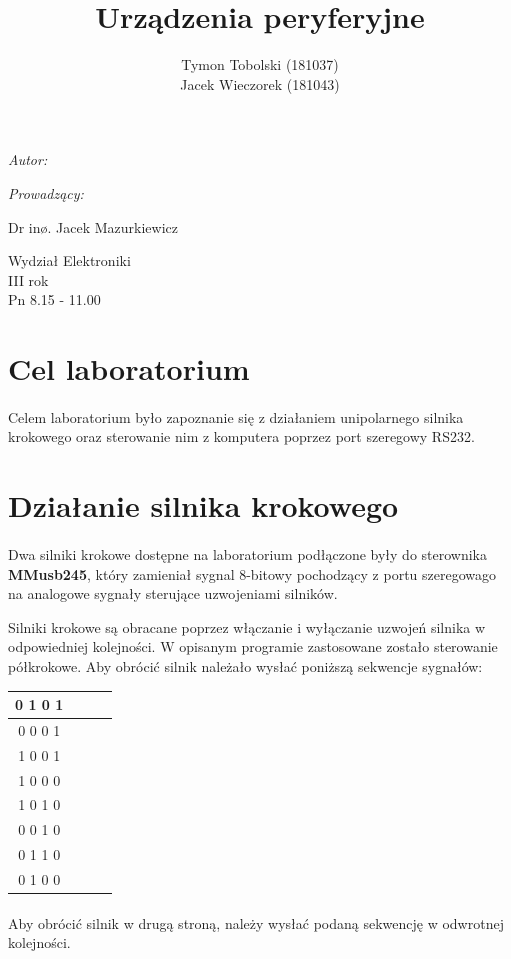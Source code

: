 \documentclass[wide,a4paper,titlepage,12pt] {article}
\title{Urządzenia peryferyjne}
\author{Tymon Tobolski (181037)\\ Jacek Wieczorek (181043)}
\makeatletter
\renewcommand{\maketitle}{
\begin{titlepage}
  \begin{center}
    \vspace*{3cm}
    \LARGE \@title \par
    \vspace{2cm}
    \textit{\small Autor:}\par
    \normalsize \@author\par \normalsize
    \vspace{3cm}
    \textit{\small Prowadzący:}\par
    Dr inø. Jacek Mazurkiewicz \par
    \vspace{2cm}
    Wydział Elektroniki\\ III rok\\ Pn 8.15 - 11.00\par
    \vspace{4cm}
    \small \@date
  \end{center}
\end{titlepage}
}
\makeatother
\begin{document}
\maketitle

\section{Cel laboratorium}
\paragraph{}
Celem laboratorium było zapoznanie się z działaniem unipolarnego silnika krokowego
oraz sterowanie nim z komputera poprzez port szeregowy RS232.

\section{Działanie silnika krokowego}
\paragraph{}
Dwa silniki krokowe dostępne na laboratorium podłączone były do sterownika \textbf{MMusb245},
który zamieniał sygnal 8-bitowy pochodzący z portu szeregowago na analogowe sygnały sterujące uzwojeniami silników.

Silniki krokowe są obracane poprzez włączanie i wyłączanie uzwojeń silnika w odpowiedniej kolejności.
W opisanym programie zastosowane zostało sterowanie półkrokowe. Aby obrócić silnik należało wysłać poniższą sekwencje sygnałów:


\begin{center}
    \begin{tabular}{|c|c|c|c|}
    \hline
    0 1 0 1 \\
    \hline
    0 0 0 1 \\
    \hline
    1 0 0 1 \\
    \hline
    1 0 0 0 \\
    \hline
    1 0 1 0 \\
    \hline
    0 0 1 0 \\
    \hline
    0 1 1 0 \\
    \hline
    0 1 0 0 \\
    \hline
   \end{tabular}
\end{center}


\paragraph{}
Aby obrócić silnik w drugą stroną, należy wysłać podaną sekwencję w odwrotnej kolejności.
\end{document}
